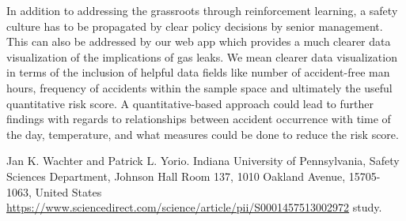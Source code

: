 \documentclass[twoside,twocolumn]{article}
\begin{document}
In addition to addressing the grassroots through reinforcement learning, a safety culture has to be propagated by clear policy decisions by senior management. This can also be addressed by our web app which provides a much clearer data visualization of the implications of gas leaks. We mean clearer data visualization in terms of the inclusion of helpful data fields like number of accident-free man hours, frequency of accidents within the sample space and ultimately the useful quantitative risk score. A quantitative-based approach could lead to further findings with regards to relationships between accident occurrence with time of the day, temperature, and what measures could be done to reduce the risk score.


\begin{thebibliography}{99} %

Jan K. Wachter and Patrick L. Yorio. Indiana University of Pennsylvania, Safety Sciences Department, Johnson Hall Room 137, 1010 Oakland Avenue, 15705-1063, United States
\newblock \url{https://www.sciencedirect.com/science/article/pii/S0001457513002972}
  study.
 
\end{thebibliography}

\end{document}
